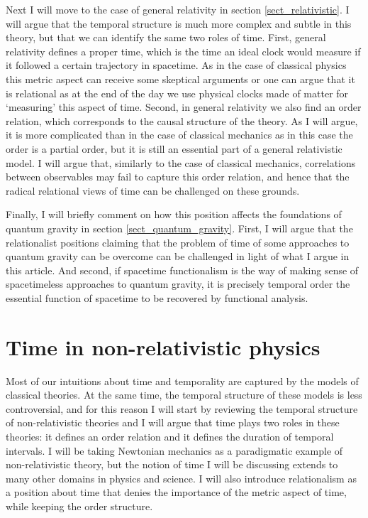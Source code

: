 \documentclass[12 pt]{article}
\begin{document}
Next I will move to the case of general relativity in section \ref{sect_relativistic}. I will argue that the temporal structure is much more complex and subtle in this theory, but that we can identify the same two roles of time. First, general relativity defines a proper time, which is the time an ideal clock would measure if it followed a certain trajectory in spacetime. As in the case of classical physics this metric aspect can receive some skeptical arguments or one can argue that it is relational as at the end of the day we use physical clocks made of matter for `measuring' this aspect of time. Second, in general relativity we also find an order relation, which corresponds to the causal structure of the theory. As I will argue, it is more complicated than in the case of classical mechanics as in this case the order is a partial order, but it is still an essential part of a general relativistic model. I will argue that, similarly to the case of classical mechanics, correlations between observables may fail to capture this order relation, and hence that the radical relational views of time can be challenged on these grounds.

Finally, I will briefly comment on how this position affects the foundations of quantum gravity in section \ref{sect_quantum_gravity}. First, I will argue that the relationalist positions claiming that the problem of time of some approaches to quantum gravity can be overcome can be challenged in light of what I argue in this article. And second, if spacetime functionalism is the way of making sense of spacetimeless approaches to quantum gravity, it is precisely temporal order the essential function of spacetime to be recovered by functional analysis.


\section{Time in non-relativistic physics} \label{sect_non-relat}

Most of our intuitions about time and temporality are captured by the models of classical theories. At the same time, the temporal structure of these models is less controversial, and for this reason I will start by reviewing the temporal structure of non-relativistic theories and I will argue that time plays two roles in these theories: it defines an order relation and it defines the duration of temporal intervals. I will be taking Newtonian mechanics as a paradigmatic example of non-relativistic theory, but the notion of time I will be discussing extends to many other domains in physics and science. I will also introduce relationalism as a position about time that denies the importance of the metric aspect of time, while keeping the order structure.
\end{document}
